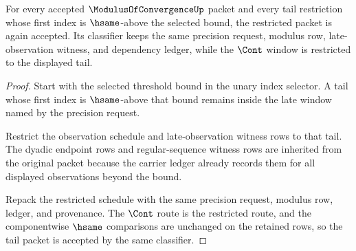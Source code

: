 \begin{theorem}\label{thm:modulusofconvergence-tail-restriction-stability}
For every accepted $\ModulusOfConvergenceUp$ packet and every tail restriction
whose first index is $\hsame$-above the selected bound, the restricted packet is
again accepted. Its classifier keeps the same precision request, modulus row,
late-observation witness, and dependency ledger, while the $\Cont$ window is
restricted to the displayed tail.
\end{theorem}
\begin{proof}
Start with the selected threshold bound in the unary index selector. A tail
whose first index is $\hsame$-above that bound remains inside the late window
named by the precision request.

Restrict the observation schedule and late-observation witness rows to that
tail. The dyadic endpoint rows and regular-sequence witness rows are inherited
from the original packet because the carrier ledger already records them for
all displayed observations beyond the bound.

Repack the restricted schedule with the same precision request, modulus row,
ledger, and provenance. The $\Cont$ route is the restricted route, and the
componentwise $\hsame$ comparisons are unchanged on the retained rows, so the
tail packet is accepted by the same classifier.
\end{proof}

